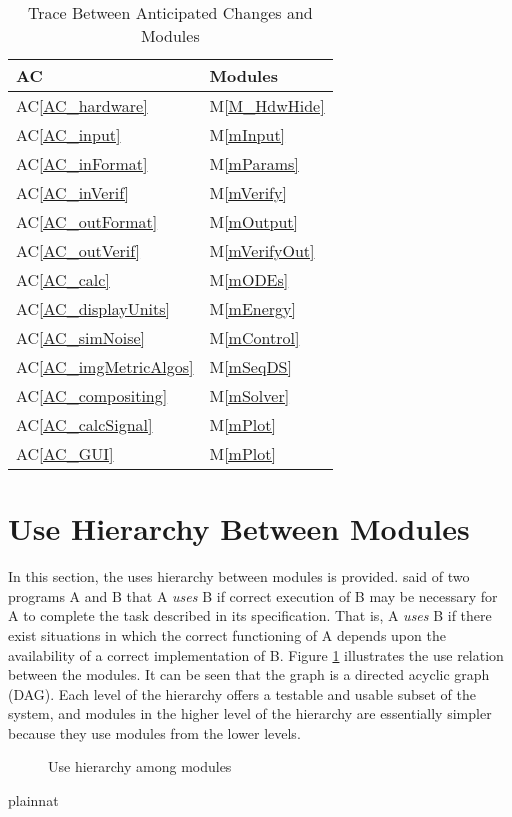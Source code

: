 \documentclass[12pt, titlepage]{article}
\newcommand{\acref}[1]{AC\ref{#1}}
\newcommand{\mref}[1]{M\ref{#1}}
\begin{document}
\begin{table}[H]
\centering
\begin{tabular}{p{} p{}}
\toprule
\textbf{AC} & \textbf{Modules}\\
\midrule
\acref{AC_hardware} & \mref{M_HdwHide}\\
\acref{AC_input} & \mref{mInput}\\
\acref{AC_inFormat} & \mref{mParams}\\
\acref{AC_inVerif} & \mref{mVerify}\\
\acref{AC_outFormat} & \mref{mOutput}\\
\acref{AC_outVerif} & \mref{mVerifyOut}\\
\acref{AC_calc} & \mref{mODEs}\\
\acref{AC_displayUnits} & \mref{mEnergy}\\
\acref{AC_simNoise} & \mref{mControl}\\
\acref{AC_imgMetricAlgos} & \mref{mSeqDS}\\
\acref{AC_compositing} & \mref{mSolver}\\
\acref{AC_calcSignal} & \mref{mPlot}\\
\acref{AC_GUI} & \mref{mPlot}\\
\bottomrule
\end{tabular}
\caption{Trace Between Anticipated Changes and Modules}
\label{TblACT}
\end{table}

\section{Use Hierarchy Between Modules} \label{SecUse}

In this section, the uses hierarchy between modules is
provided. \citet{Parnas1978} said of two programs A and B that A {\em uses} B if
correct execution of B may be necessary for A to complete the task described in
its specification. That is, A {\em uses} B if there exist situations in which
the correct functioning of A depends upon the availability of a correct
implementation of B.  Figure \ref{FigUH} illustrates the use relation between
the modules. It can be seen that the graph is a directed acyclic graph
(DAG). Each level of the hierarchy offers a testable and usable subset of the
system, and modules in the higher level of the hierarchy are essentially simpler
because they use modules from the lower levels.

\begin{figure}[H]
\centering
\caption{Use hierarchy among modules}
\label{FigUH}
\end{figure}


 {plainnat}


\newpage{}
\end{document}
